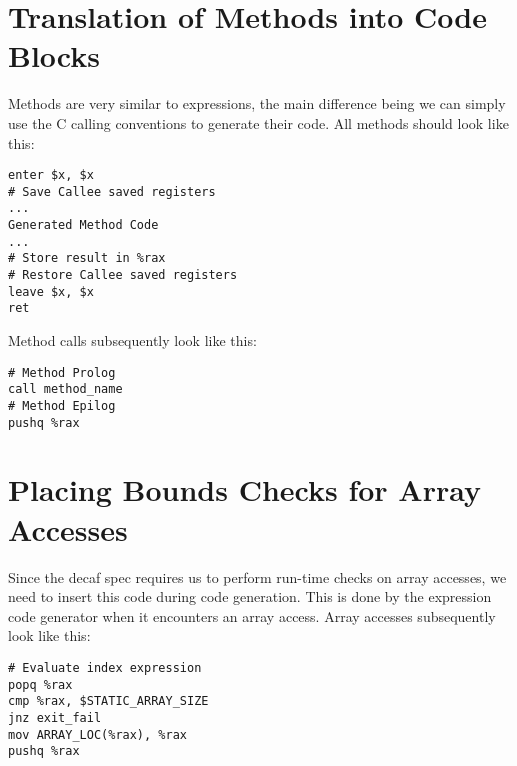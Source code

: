 \documentclass[11pt]{article}
\begin{document}
\section {Translation of Methods into Code Blocks}
Methods are very similar to expressions, the main difference being we can simply use the C calling conventions to generate their code. All methods should look like this: 

\begin{verbatim}
enter $x, $x
# Save Callee saved registers
...
Generated Method Code
...
# Store result in %rax
# Restore Callee saved registers
leave $x, $x
ret
\end{verbatim}

\noindent Method calls subsequently look like this: 
\begin{verbatim}
# Method Prolog
call method_name
# Method Epilog
pushq %rax
\end{verbatim}

\section {Placing Bounds Checks for Array Accesses}
Since the decaf spec requires us to perform run-time checks on array accesses, we need to insert this code during code generation. This is done by the expression code generator when it encounters an array access. Array accesses subsequently look like this: 

\begin{verbatim}
# Evaluate index expression
popq %rax 
cmp %rax, $STATIC_ARRAY_SIZE
jnz exit_fail
mov ARRAY_LOC(%rax), %rax
pushq %rax

\end{verbatim}
\end{document}
